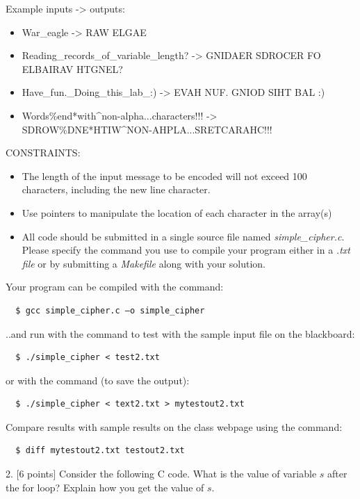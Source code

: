 \documentclass[12pt]{extarticle}
\begin{document}
\clearpage

Example inputs -> outputs:
\begin{itemize}
    \item War\_eagle -> RAW ELGAE
    \item Reading\_records\_of\_variable\_length? -> GNIDAER SDROCER FO ELBAIRAV HTGNEL? 
    \item Have\_fun.\_Doing\_this\_lab\_:) -> EVAH NUF. GNIOD SIHT BAL :)
    \item Words\%end*with\^{}non-alpha...characters!!! -> \\SDROW\%DNE*HTIW\^{}NON-AHPLA...SRETCARAHC!!!
\end{itemize}


CONSTRAINTS:
\begin{itemize}
    \item  The length of the input message to be encoded will not exceed 100 characters, including the new line character.
    \item Use pointers to manipulate the location of each character in the array(s)
    \item All code should be submitted in a single source file named \textit{simple\_cipher.c}. Please specify the command you use to compile your program either in a \textit{.txt file} or by submitting a \textit{Makefile} along with your solution.
\end{itemize}

Your program can be compiled with the command:\\
\begin{verbatim}
  $ gcc simple_cipher.c –o simple_cipher
\end{verbatim}
..and run with the command to test with the sample input file on the blackboard:
\begin{verbatim}
  $ ./simple_cipher < test2.txt
\end{verbatim}
      
      
or with the command (to save the output):
\begin{verbatim}
  $ ./simple_cipher < text2.txt > mytestout2.txt
\end{verbatim}
      
Compare results with sample results on the class webpage using the command:
\begin{verbatim}
  $ diff mytestout2.txt testout2.txt
\end{verbatim}
\pagebreak

2. [6 points] Consider the following C code. What is the value of variable $s$ after the for loop? Explain how you get the value of $s$.  \\%
\end{document}
